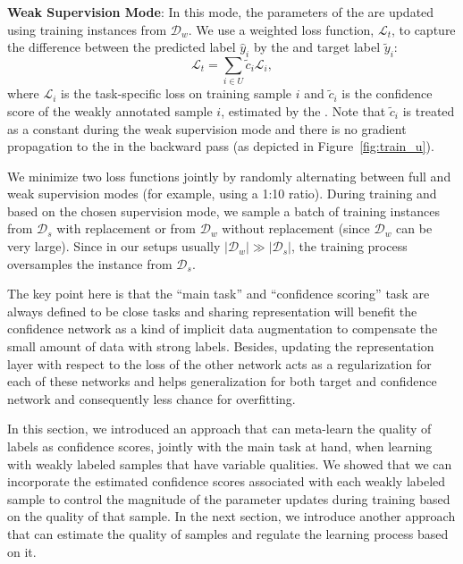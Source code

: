 \textbf{Weak Supervision Mode}: In this mode, the parameters of the \tnet are updated using training instances from $\mathcal{D}_w$. We use a weighted loss function, $\mathcal{L}_t$, to capture the difference between the predicted label $\hat{y}_i$ by the \tnet and target label $\tilde{y}_i$:
\begin{equation}
\mathcal{L}_t = \sum_{i\in U} \tilde{c}_i \mathcal{L}_i,
\end{equation}
where $\mathcal{L}_i$ is the task-specific loss on training sample $i$ and $\tilde{c}_i$ is the confidence score of the weakly annotated sample $i$, estimated by the \cnet.
Note that $\tilde{c}_i$ is treated as a constant during the weak supervision mode and there is no gradient propagation to the \cnet in the backward pass (as depicted in Figure~\ref{fig:train_u}). 

\medskip
We minimize two loss functions jointly by randomly alternating between full and weak supervision modes (for example, using a 1:10 ratio).
During training and based on the chosen supervision mode, we sample a batch of training instances from $\mathcal{D}_s$ with replacement or from $\mathcal{D}_w$ without replacement (since $\mathcal{D}_w$ can be very large). Since in our setups usually $|\mathcal{D}_w| \gg |\mathcal{D}_s|$, the training process oversamples the instance from $\mathcal{D}_s$. 

The key point here is that the ``main task'' and ``confidence scoring'' task are always defined to be close tasks and sharing representation will benefit the confidence network as a kind of implicit data augmentation to compensate the small amount of data with strong labels.
Besides, updating the representation layer with respect to the loss of the other network acts as a regularization for each of these networks and helps generalization for both target and confidence network and consequently less chance for overfitting.


\medskip
In this section, we introduced an approach that can meta-learn the quality of labels as confidence scores, jointly with the main task at hand, when learning with weakly labeled samples that have variable qualities. 
We showed that we can incorporate the estimated confidence scores associated with each weakly labeled sample to control the magnitude of the parameter updates during training based on the quality of that sample. 
In the next section, we introduce another approach that can estimate the quality of samples and regulate the learning process based on it.